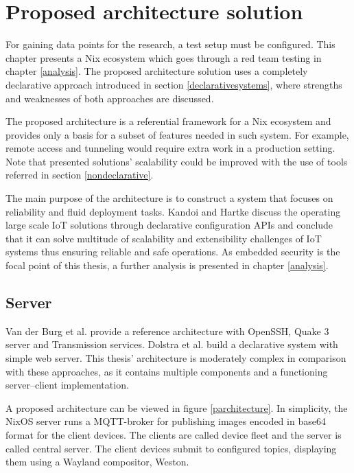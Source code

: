 \chapter{Proposed architecture solution} \label{architecture}

For gaining data points for the research, a test setup must be
configured. This chapter presents a Nix ecosystem which goes through
a red team testing in chapter \ref{analysis}. The proposed
architecture solution uses a completely declarative approach
introduced in section \ref{declarativesystems}, where strengths and weaknesses of both approaches are
discussed.

The proposed architecture is a referential framework for a Nix
ecosystem and provides only a basis for a subset of features needed in
such system. For example, remote access and tunneling would require
extra work in a production setting. Note that presented solutions'
scalability could be improved with the use of tools referred in
section \ref{nondeclarative}.

The main purpose of the architecture is to construct a system that
focuses on reliability and fluid deployment tasks. Kandoi and Hartke \cite{kandoi2021operating}
discuss the operating large scale IoT solutions through declarative
configuration APIs and conclude that it can solve multitude of
scalability and extensibility challenges of IoT systems thus ensuring
reliable and safe operations. As embedded
security is the focal point of this thesis, a further analysis is
presented in chapter \ref{analysis}.

\section{Server}

Van der Burg et al. \cite{van2013reference} provide a reference
architecture with OpenSSH, Quake 3 server and Transmission
services. Dolstra et al. \cite{dolstra2013charon} build a declarative
system with simple web server. This thesis' architecture is moderately
complex in comparison with these approaches, as it contains multiple
components and a functioning server–client implementation.

A proposed architecture can be viewed in figure
\ref{parchitecture}. In simplicity, the NixOS server runs a
MQTT-broker for publishing images encoded in base64 format for the
client devices. The clients are called device fleet and the server
is called central server. The client devices submit to configured
topics, displaying them using a Wayland compositor, Weston.

